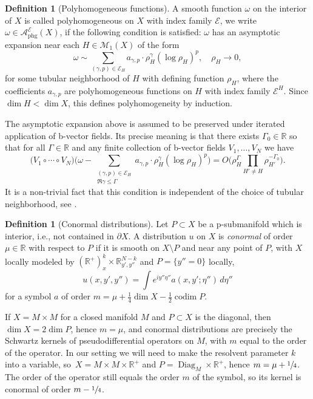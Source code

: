 \documentclass[11pt]{article}
\newcommand{\ie}{i.e.,\xspace}
\numberwithin{equation}{section}
\theoremstyle{plain}
\theoremstyle{definition}
\newtheorem{defn}[Th]{Definition}
\newcommand{\R}{{\mathbb{R}}}
\newcommand\calE{{\mathcal E}}
\newcommand\calM{{\mathcal M}}
\newcommand {\phg}{{\mathrm{phg}}}
\DeclareMathOperator{\codim}{codim}
\DeclareMathOperator{\Diag}{Diag}
\begin{document}
\begin{defn}[Polyhomogeneous functions] A smooth function $\omega$ on the interior of $X$ is called polyhomogeneous
on $X$ with index family $\calE$, we write $ \omega \in \mathcal{A}^{\calE}_{\phg}(X)$, if the following condition is satisfied:
$\omega$ has an asymptotic
expansion near each \hbox{$H\in\calM_1(X)$} of the form
\[
\omega \sim \sum_{(\gamma,p) \in \calE_{H}} a_{\gamma,p} \cdot \rho_{H}^{\gamma}
(\log\rho_H)^{p}, \quad \rho_{H} \to 0,
\]
for some tubular neighborhood of $H$ with defining function $\rho_H$, where the coefficients $a_{\gamma,p}$ are
polyhomogeneous functions on $H$ with index family $\calE^H$.
Since \hbox{$\dim H < \dim X$}, this defines polyhomogeneity by induction.

The asymptotic expansion above is assumed to be preserved under iterated application of b-vector fields. Its precise meaning is that there exists $\Gamma_0\in\R$ so that for all $\Gamma\in\R$ and any finite collection of b-vector fields $V_1,\dots, V_N$ we have
\[
\bigl(V_1 \circ \cdots \circ V_N \bigr) \biggl(
\omega - \sum_{\substack{(\gamma,p) \in \calE_{H}\\\Re\gamma\leq\Gamma}} a_{\gamma,p} \cdot \rho_{H}^{\gamma}
(\log\rho_H)^{p} \biggr)\textstyle
= O \bigl(\rho_H^\Gamma \prod_{H'\neq H} \rho_{H'}^{-\Gamma_0}\bigr).
\]
It is a non-trivial fact that this condition is independent of the choice of tubular neighborhood, see \cite{Mel:CCDMWC}.
\end{defn}

\begin{defn}
[Conormal distributions] \label{def:conormal distr}
Let $P\subset X$ be a p-submanifold which is interior, \ie not contained in $\partial X$.
A distribution $u$ on $X$ is \emph{conormal} of order $\mu\in\R$ with respect to $P$ if it is smooth on $X\setminus P$ and near any point of $P$, with $X$ locally modeled by $(\R^+)^k_x \times \R^{N-k}_{y',y''}$ and $P=\{y''=0\}$ locally,
\begin{equation}
\label{eqn:def conormal}
u(x,y',y'') = \int e^{iy''\eta''}a(x,y';\eta'')\,d\eta''
\end{equation}
for a symbol $a$ of order $m=\mu+\frac14\dim X - \frac12\codim P$.
\end{defn}
If $X=M\times M$ for a closed manifold $M$ and $P\subset X$ is the diagonal,
then $\dim X=2\dim P$, hence $m=\mu$, and conormal distributions are precisely the Schwartz kernels of pseudodifferential operators on $M$,
with $m$ equal to the order of the operator. In our setting we will need to make the resolvent parameter $k$ into a variable, so~$X=M\times M\times\R^+$ and $P=\Diag_M\times\R^+$, hence $m=\mu+\sfrac14$. The order of the operator still equals the order $m$ of the symbol, so its kernel is conormal of order $m-\sfrac14$.
\end{document}
